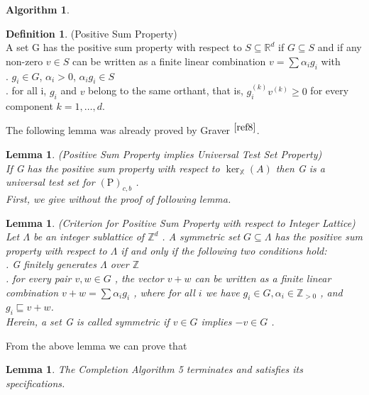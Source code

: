 \documentclass{article}
\theoremstyle{plain}
\newtheorem{lemma}[theorem]{Lemma}
\theoremstyle{definition}
\newtheorem{definition}[theorem]{Definition}
\newtheorem{algorithm}[theorem]{Algorithm}
\begin{document}
\begin{algorithm}
\begin{definition} (Positive Sum Property) \\
A set  G  has the positive sum property with respect to  $S \subseteq \mathbb{R}^{d}$  if $ G \subseteq S$  and if any non-zero  $v \in S$  can be written as a finite linear combination  $v=\sum \alpha_{i} g_{i}$  with\\
.  $g_{i} \in G$, $\alpha_{i}>0$, $\alpha_{i} g_{i} \in S$\\
.  for all  i, $g_{i}$  and  $v$  belong to the same orthant, that  is, $g_{i}^{(k)} v^{(k)} \geq 0$  for every component  $k=1, \ldots, d $. 
\end{definition}

The following lemma was already proved by Graver $^{\cite{ref8}}$.\\

\begin{lemma} (Positive Sum Property implies Universal Test Set Property) \\
If  G  has the positive sum property with respect to  $\operatorname{ker}_{\mathbb{X}}(A) $ then  G  is a universal test set for  $(\mathrm{P})_{c, b}$ .\\

First, we give without the proof of following lemma. \end{lemma}

\begin{lemma}(Criterion for Positive Sum Property with respect to Integer Lattice) \\
Let  $\Lambda$  be an integer sublattice of  $\mathbb{Z}^{d}$ . A symmetric set  $G \subseteq \Lambda$  has the positive sum property with respect to  $\Lambda$  if and only if the following two conditions hold: \\
. G finitely generates  $\Lambda$  over  $\mathbb{Z}$  \\
. for every pair  $v, w \in G$ , the vector  $v+w$  can be written as a finite linear combination $ v+w=\sum \alpha_{i} g_{i}$ , where for all $ i$ we have  $g_{i} \in G, \alpha_{i} \in \mathbb{Z}_{>0}$ , and  $g_{i} \sqsubseteq v+w$.\\
Herein, a set  G  is called symmetric if  $v \in G$  implies  $-v \in G$ . \end{lemma}

From the above lemma we can prove that 

\begin{lemma}The Completion Algorithm 5 terminates and satisfies its specifications. \end{lemma}


\end{algorithm}
\end{document}
